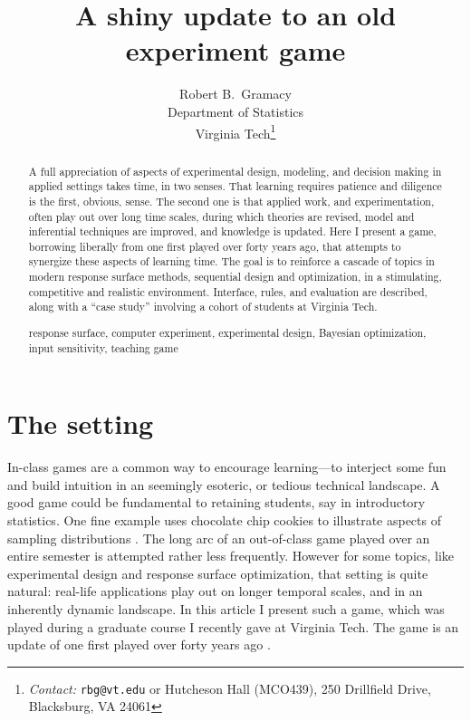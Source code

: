 \documentclass[12pt]{article}
\begin{document}


\title{\vspace{-1cm}
A shiny update to an old experiment game}
\author{
Robert B.~Gramacy\\
Department of Statistics\\
Virginia Tech\thanks{{\em Contact:} {\tt rbg@vt.edu} or Hutcheson Hall (MCO439),
250 Drillfield Drive, Blacksburg, VA 24061}}
\date{}
\maketitle


\begin{abstract}
A full appreciation of aspects of experimental design, modeling, and
decision making in applied settings takes time, in two senses. That learning
requires patience and diligence is the first, obvious, sense. The second one
is that applied work, and experimentation, often play out over long time
scales, during which theories are revised, model and inferential techniques
are improved, and knowledge is updated. Here I present a game,
borrowing liberally from one first played over forty years ago, that attempts
to synergize these aspects of learning time.   The goal is to reinforce a
cascade of topics in modern response surface methods, sequential design and
optimization, in a stimulating, competitive and realistic environment.
Interface, rules, and evaluation are described, along with a ``case study''
involving a cohort of students at Virginia Tech.

  \bigskip
  response surface, computer experiment, experimental design, Bayesian optimization, input sensitivity, teaching game
\end{abstract}


\doublespacing

\section{The setting}
\label{sec:intro}


In-class games are a common way to encourage learning---to interject some fun
and build intuition in an seemingly esoteric, or tedious technical landscape.
A good game could be fundamental to retaining students, say in introductory
statistics.  One fine example uses chocolate chip cookies to illustrate
aspects of sampling distributions \citep{lee:2007}.  The long arc of an
out-of-class game played over an entire semester is attempted rather less
frequently. However for some topics, like experimental design and response
surface optimization, that setting is quite natural: real-life applications
play out on longer temporal scales, and in an inherently dynamic landscape. In
this article I present such a game, which was played during a graduate
course I recently gave at Virginia Tech. The game is an update of one
first played over forty years ago \citep{mead:freeman:1973}.
\end{document}
